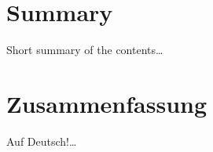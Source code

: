 

\begingroup
\let\clearpage\relax
\let\cleardoublepage\relax
\let\cleardoublepage\relax

\chapter*{Summary} %

Short summary of the contents\dots


\chapter*{Zusammenfassung} %

Auf Deutsch!\ldots

\endgroup			

\vfill